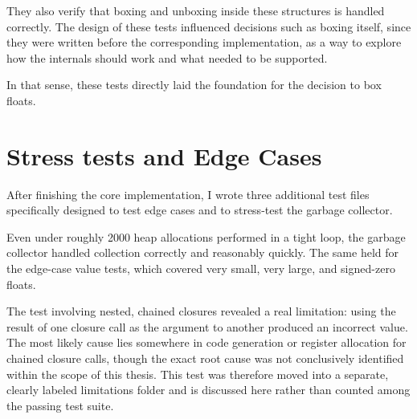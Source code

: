 They also verify that boxing and unboxing inside these structures is handled correctly. The design of these tests influenced decisions such as boxing itself, since they were written before the corresponding implementation, as a way to explore how the internals should work and what needed to be supported.

In that sense, these tests directly laid the foundation for the decision to box floats.

\section{Stress tests and Edge Cases}

After finishing the core implementation, I wrote three additional test files specifically designed to test edge cases and to stress-test the garbage collector.

Even under roughly 2000 heap allocations performed in a tight loop, the garbage collector handled collection correctly and reasonably quickly. The same held for the edge-case value tests, which covered very small, very large, and signed-zero floats.

The test involving nested, chained closures revealed a real limitation: using the result of one closure call as the argument to another produced an incorrect value. The most likely cause lies somewhere in code generation or register allocation for chained closure calls, though the exact root cause was not conclusively identified within the scope of this thesis. This test was therefore moved into a separate, clearly labeled limitations folder and is discussed here rather than counted among the passing test suite.